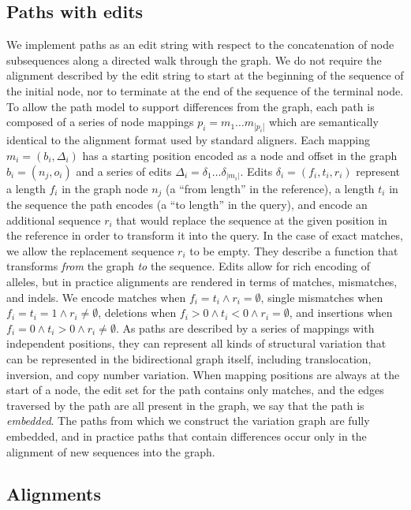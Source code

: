 \subsection{Paths with edits}

We implement paths as an edit string with respect to the concatenation of node subsequences along a directed walk through the graph.
We do not require the alignment described by the edit string to start at the beginning of the sequence of the initial node, nor to terminate at the end of the sequence of the terminal node.
To allow the path model to support differences from the graph, each path is composed of a series of node mappings $p_i = m_1 \ldots m_{|p_i|}$ which are semantically identical to the alignment format used by standard aligners.
Each mapping $m_i = ( b_i, \Delta_i )$ has a starting position encoded as a node and offset in the graph $b_i = ( n_j, o_i )$ and a series of edits $\Delta_i = \delta_1 \ldots \delta_{|m_i|}$.
Edits $\delta_i = ( f_i, t_i, r_i )$ represent a length $f_i$ in the graph node $n_j$ (a ``from length'' in the reference), a length $t_i$ in the sequence the path encodes (a ``to length'' in the query), and encode an additional sequence $r_i$ that would replace the sequence at the given position in the reference in order to transform it into the query.
In the case of exact matches, we allow the replacement sequence $r_i$ to be empty.
They describe a function that transforms \emph{from} the graph \emph{to} the sequence.
Edits allow for rich encoding of alleles, but in practice alignments are rendered in terms of matches, mismatches, and indels.
We encode matches when $f_i = t_i \land r_i = \emptyset$, single mismatches when $f_i = t_i = 1 \land r_i \neq \emptyset$, deletions when $f_i > 0 \land t_i < 0 \land r_i = \emptyset$, and insertions when $f_i = 0 \land t_i > 0 \land r_i \neq \emptyset$.
As paths are described by a series of mappings with independent positions, they can represent all kinds of structural variation that can be represented in the bidirectional graph itself, including translocation, inversion, and copy number variation.
When mapping positions are always at the start of a node, the edit set for the path contains only matches, and the edges traversed by the path are all present in the graph, we say that the path is \emph{embedded}.
The paths from which we construct the variation graph are fully embedded, and in practice paths that contain differences occur only in the alignment of new sequences into the graph.

\subsection{Alignments}

